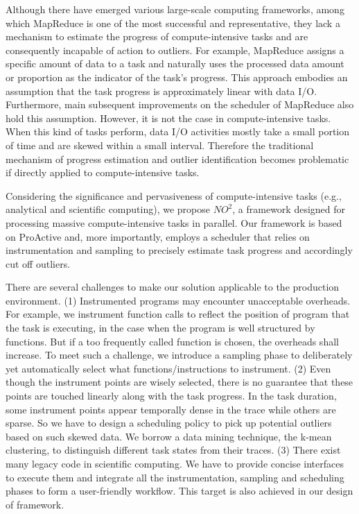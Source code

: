 Although there have emerged various large-scale computing frameworks, among which MapReduce is one of the most successful and representative, they lack a mechanism to estimate the progress of compute-intensive tasks and are consequently incapable of action to outliers. For example, MapReduce assigns a specific amount of data to a task and naturally uses the processed data amount or proportion as the indicator of the task's progress. This approach embodies an assumption that the task progress is approximately linear with data I/O. Furthermore, main subsequent improvements on the scheduler of MapReduce also hold this assumption. However, it is not the case in compute-intensive tasks. When this kind of tasks perform, data I/O activities mostly take a small portion of time and are skewed within a small interval. Therefore the traditional mechanism of progress estimation and outlier identification becomes problematic if directly applied to compute-intensive tasks.

Considering the significance and pervasiveness of compute-intensive tasks (e.g., analytical and scientific computing), we propose $NO^2$, a framework designed for processing massive compute-intensive tasks in parallel. Our framework is based on ProActive and, more importantly, employs a scheduler that relies on instrumentation and sampling to precisely estimate task progress and accordingly cut off outliers.

There are several challenges to make our solution applicable to the production environment. (1) Instrumented programs may encounter unacceptable overheads. For example, we instrument function calls to reflect the position of program that the task is executing, in the case when the program is well structured by functions. But if a too frequently called function is chosen, the overheads shall increase. To meet such a challenge, we introduce a sampling phase to deliberately yet automatically select what functions/instructions to instrument. (2) Even though the instrument points are wisely selected, there is no guarantee that these points are touched linearly along with the task progress. In the task duration, some instrument points appear temporally dense in the trace while others are sparse. So we have to design a scheduling policy to pick up potential outliers based on such skewed data. We borrow a data mining technique, the k-mean clustering, to distinguish different task states from their traces. (3) There exist many legacy code in scientific computing. We have to provide concise interfaces to execute them and integrate all the instrumentation, sampling and scheduling phases to form a user-friendly workflow. This target is also achieved in our design of framework.

